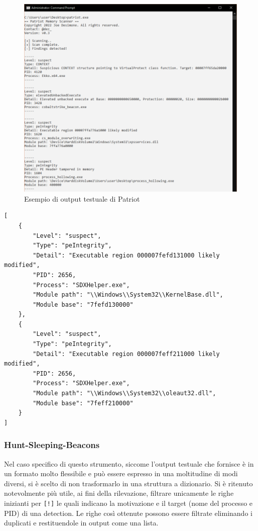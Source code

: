 \begin{figure}[htbp]
    \centering
    \includegraphics[width=\textwidth]{assets/patriot-example-output.png}
    \caption{Esempio di output testuale di Patriot}
    \label{fig:dynamic-patriot-output-text}
\end{figure}

\begin{code}
\begin{verbatim}
[
    {
        "Level": "suspect",
        "Type": "peIntegrity",
        "Detail": "Executable region 000007fefd131000 likely modified",
        "PID": 2656,
        "Process": "SDXHelper.exe",
        "Module path": "\\Windows\\System32\\KernelBase.dll",
        "Module base": "7fefd130000"
    },
    {
        "Level": "suspect",
        "Type": "peIntegrity",
        "Detail": "Executable region 000007feff211000 likely modified",
        "PID": 2656,
        "Process": "SDXHelper.exe",
        "Module path": "\\Windows\\System32\\oleaut32.dll",
        "Module base": "7feff210000"
    }
]
\end{verbatim}
\caption{Esempio di output di Patriot trasformato in JSON dal plugin}
\end{code}

\subsubsection{Hunt-Sleeping-Beacons}
Nel caso specifico di questo strumento, siccome l'output testuale che fornisce è in un formato molto flessibile e può essere espresso in una moltitudine di modi diversi, si è scelto di non trasformarlo in una struttura a dizionario.
Si è ritenuto notevolmente più utile, ai fini della rilevazione, filtrare unicamente le righe inizianti per \texttt{[!]} le quali indicano la motivazione e il target (nome del processo e PID) di una detection.
Le righe così ottenute possono essere filtrate eliminando i duplicati e restituendole in output come una lista.

